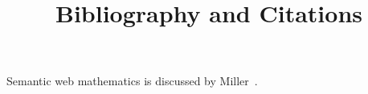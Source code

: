 \documentclass{article}
\title{Bibliography and Citations}
\begin{document}
\maketitle
Semantic web mathematics is discussed by Miller~\cite{miller2018latexml}.



\end{document}
